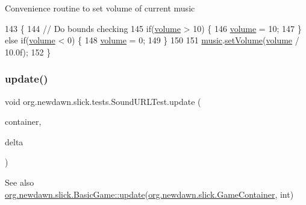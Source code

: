 Convenience routine to set volume of current music 
\begin{DoxyCode}
143                              \{
144         \textcolor{comment}{// Do bounds checking}
145         \textcolor{keywordflow}{if}(\mbox{\hyperlink{classorg_1_1newdawn_1_1slick_1_1tests_1_1_sound_u_r_l_test_ac1ddaaa87f02c72f643d03cf7a6014db}{volume}} > 10) \{
146             \mbox{\hyperlink{classorg_1_1newdawn_1_1slick_1_1tests_1_1_sound_u_r_l_test_ac1ddaaa87f02c72f643d03cf7a6014db}{volume}} = 10;
147         \} \textcolor{keywordflow}{else} \textcolor{keywordflow}{if}(\mbox{\hyperlink{classorg_1_1newdawn_1_1slick_1_1tests_1_1_sound_u_r_l_test_ac1ddaaa87f02c72f643d03cf7a6014db}{volume}} < 0) \{
148             \mbox{\hyperlink{classorg_1_1newdawn_1_1slick_1_1tests_1_1_sound_u_r_l_test_ac1ddaaa87f02c72f643d03cf7a6014db}{volume}} = 0;
149         \}
150         
151         \mbox{\hyperlink{classorg_1_1newdawn_1_1slick_1_1tests_1_1_sound_u_r_l_test_ab3104882d68cde6d826346758faec7fb}{music}}.\mbox{\hyperlink{classorg_1_1newdawn_1_1slick_1_1_music_ac80cc7fda5ba80437bf1ea6efdc3f1a7}{setVolume}}(\mbox{\hyperlink{classorg_1_1newdawn_1_1slick_1_1tests_1_1_sound_u_r_l_test_ac1ddaaa87f02c72f643d03cf7a6014db}{volume}} / 10.0f);
152     \}
\end{DoxyCode}
\mbox{\label{classorg_1_1newdawn_1_1slick_1_1tests_1_1_sound_u_r_l_test_ad0e6dca29bc3052812af2834f4184431}} 
\subsubsection{\texorpdfstring{update()}{update()}}
{\footnotesize\ttfamily void org.\+newdawn.\+slick.\+tests.\+Sound\+U\+R\+L\+Test.\+update (\begin{DoxyParamCaption}\item[{\mbox{\hyperlink{classorg_1_1newdawn_1_1slick_1_1_game_container}{Game\+Container}}}]{container,  }\item[{int}]{delta }\end{DoxyParamCaption})\hspace{0.3cm}{\ttfamily [inline]}}

\begin{DoxySeeAlso}{See also}
\mbox{\hyperlink{classorg_1_1newdawn_1_1slick_1_1_basic_game_acfe6fa05aef83bff1631af91a3e4bd20}{org.\+newdawn.\+slick.\+Basic\+Game\+::update}}(\mbox{\hyperlink{classorg_1_1newdawn_1_1slick_1_1_game_container}{org.\+newdawn.\+slick.\+Game\+Container}}, int) 
\end{DoxySeeAlso}


